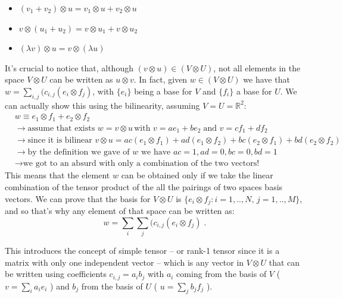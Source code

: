 \documentclass[12pt,a4paper]{article}
\begin{document}
\begin{itemize}
	\item $(v_1 + v_2) \otimes u = v_1 \otimes u + v_2 \otimes u$
	\item $v \otimes (u_1 + u_2) = v \otimes u_1 + v \otimes u_2$
	\item $(\lambda v) \otimes u = v \otimes (\lambda u)$
\end{itemize}
It's crucial to notice that, although $(v\otimes u) \in (V\otimes U)$, not all elements in the space $V\otimes U$ can be written as $u \otimes v$. In fact, given $w \in (V\otimes U)$ we have that $w = \sum_{i,j}(c_{i,j} (e_i \otimes f_j)$, with $\{e_i\}$ being a base for $V$ and $\{f_i\}$ a base for $U$.
We can actually show this using the bilinearity, assuming $V=U=\mathbb{R}^2$:
\begin{align*}
	&w \equiv e_1 \otimes f_1 + e_2 \otimes f_2\\
	&\rightarrow \text{assume that exists } w = v\otimes u\, \text{with } v=a e_1+b e_2\;\text{and }v = c f_1 + d f_2\\
	&\rightarrow \text{since it is bilinear } v\otimes u = ac (e_1 \otimes f_1) + ad (e_1 \otimes f_2) + bc (e_2 \otimes f_1) + bd (e_2 \otimes f_2)\\
	&\rightarrow \text{by the definition we gave of $w$ we have } ac=1, ad=0, bc=0, bd=1\\
	&\rightarrow \text{we got to an absurd with only a combination of the two vectors!}
\end{align*}
This means that the element $w$ can be obtained only if we take the linear combination of the tensor product of the all the pairings of two spaces basis vectors. We can prove that the basis for $V\otimes U$ is $\{e_i\otimes f_j : i=1,..,N, \, j=1,..,M\}$, and so that's why any element of that space can be written as:
\begin{equation*}
	w = \sum_{i}\sum_{j}(c_{i,j} (e_i \otimes f_j) \;.
\end{equation*}

This introduces the concept of simple tensor -- or rank-1 tensor since it is a matrix with only one independent vector -- which is any vector in $V\otimes U$ that can be written using coefficients $c_{i,j}=a_i b_j$ with $a_i$ coming from the basis of $V$ ( $v=\sum_i a_i e_i$ ) and $b_j$ from the basis of $U$ ( $u=\sum_j b_j f_j$ ).
\end{document}

